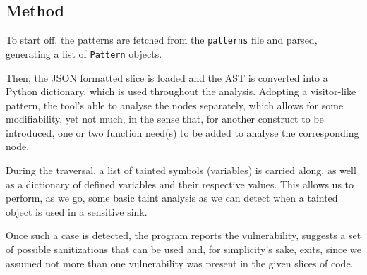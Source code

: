 \subsection*{Method}
\label{sec:experimental.method}

To start off, the patterns are fetched from the \verb|patterns| file and parsed,
generating a list of \verb|Pattern| objects.

Then, the JSON formatted slice is loaded and the AST is converted into a Python
dictionary, which is used throughout the analysis. Adopting a visitor-like
pattern, the tool's able to analyse the nodes separately, which allows for some
modifiability, yet not much, in the sense that, for another construct to be
introduced, one or two function need(s) to be added to analyse the corresponding
node.

During the traversal, a list of tainted symbols (variables) is carried along, as
well as a dictionary of defined variables and their respective values. This
allows us to perform, as we go, some basic taint analysis as we can detect when
a tainted object is used in a sensitive sink.

Once such a case is detected, the program reports the vulnerability, suggests
a set of possible sanitizations that can be used and, for simplicity's sake,
exits, since we assumed not more than one vulnerability was present in the given
slices of code.
